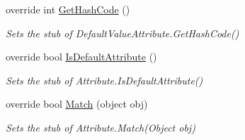 \begin{DoxyCompactItemize}
override int \hyperlink{class_system_1_1_component_model_1_1_fakes_1_1_stub_default_value_attribute_a8218c73ec0976479eabc2468cea3149c}{Get\-Hash\-Code} ()
\begin{DoxyCompactList}\small\item\em Sets the stub of Default\-Value\-Attribute.\-Get\-Hash\-Code()\end{DoxyCompactList}\item 
override bool \hyperlink{class_system_1_1_component_model_1_1_fakes_1_1_stub_default_value_attribute_a5be4e1ef92e5cf2b50f92ed98975dcf7}{Is\-Default\-Attribute} ()
\begin{DoxyCompactList}\small\item\em Sets the stub of Attribute.\-Is\-Default\-Attribute()\end{DoxyCompactList}\item 
override bool \hyperlink{class_system_1_1_component_model_1_1_fakes_1_1_stub_default_value_attribute_afe59845b37aa01ae66290e0590a91b56}{Match} (object obj)
\begin{DoxyCompactList}\small\item\em Sets the stub of Attribute.\-Match(\-Object obj)\end{DoxyCompactList}\end{DoxyCompactItemize}
